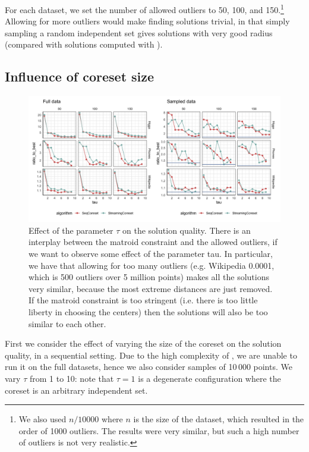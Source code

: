 For each dataset, we set the number of allowed outliers to 50, 100, and 150.\footnote{We also used $n/10000$ where $n$ is the size of the dataset, which resulted in the order of 1000 outliers. The results were very similar, but such a high number of outliers is not very realistic.}
Allowing for more outliers would make finding solutions trivial, in that simply sampling a random independent set
gives solutions with very good radius (compared with solutions computed with \chen).

\subsection{Influence of coreset size}
\label{sec:exp:coreset-size}

\begin{figure}
    \includegraphics[width=\textwidth]{seq-effect}
    \caption{
        \label{fig:seq-effect}
        Effect of the parameter $\tau$ on the solution quality.
        There is an interplay between the matroid constraint and the allowed outliers, if we want to observe some effect of the parameter tau.
        In particular, we have that allowing for too many outliers (e.g. Wikipedia 0.0001, which is 500 outliers over 5 million points) makes all the solutions very similar, because the most extreme distances are just removed.
        If the matroid constraint is too stringent (i.e. there is too little liberty in choosing the centers)
        then the solutions will also be too similar to each other.
    }
\end{figure}

First we consider the effect of varying the size of the coreset on the solution quality, in a sequential setting.
Due to the high complexity of \chen, we are unable to run it on the
full datasets, hence we also consider samples of 10\,000 points.
We vary $\tau$ from 1 to 10: note that $\tau=1$ is a degenerate configuration where the coreset is an arbitrary independent set.

